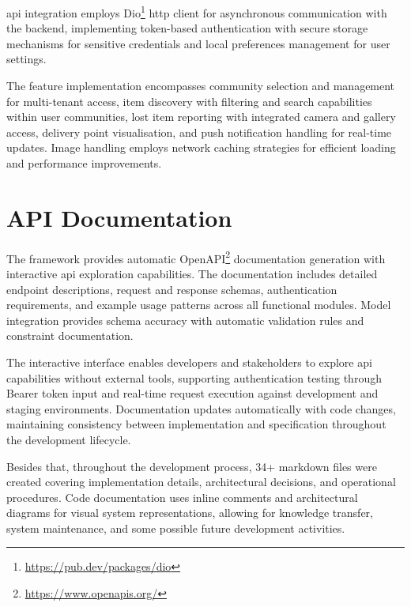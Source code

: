 \ac{api} integration employs Dio\footnote{\url{https://pub.dev/packages/dio}} \ac{http} client for asynchronous communication with the backend, implementing token-based authentication with secure storage mechanisms for sensitive credentials and local preferences management for user settings.

The feature implementation encompasses community selection and management for multi-tenant access, item discovery with filtering and search capabilities within user communities, lost item reporting with integrated camera and gallery access, delivery point visualisation, and push notification handling for real-time updates. Image handling employs network caching strategies for efficient loading and performance improvements.




\section{API Documentation} \label{section:api_documentation}

The framework provides automatic OpenAPI\footnote{\url{https://www.openapis.org/}} documentation generation with interactive \ac{api} exploration capabilities. The documentation includes detailed endpoint descriptions, request and response schemas, authentication requirements, and example usage patterns across all functional modules. Model integration provides schema accuracy with automatic validation rules and constraint documentation.

The interactive interface enables developers and stakeholders to explore \ac{api} capabilities without external tools, supporting authentication testing through Bearer token input and real-time request execution against development and staging environments. Documentation updates automatically with code changes, maintaining consistency between implementation and specification throughout the development lifecycle.

Besides that, throughout the development process, 34+ markdown files were created covering implementation details, architectural decisions, and operational procedures. Code documentation uses inline comments and architectural diagrams for visual system representations, allowing for knowledge transfer, system maintenance, and some possible future development activities.


